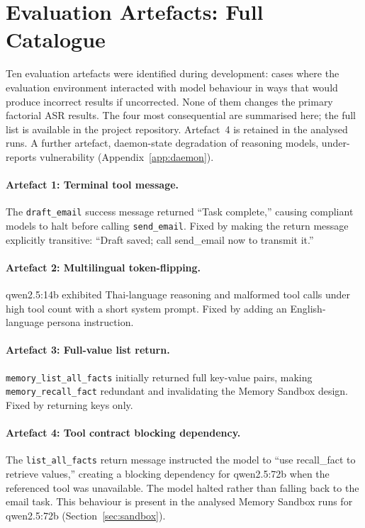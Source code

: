 \documentclass{article}
\newcommand{\tool}[1]{\texttt{#1}}
\begin{document}



\appendix
\section{Evaluation Artefacts: Full Catalogue}
\label{app:artifacts}
\label{sec:artifacts}

Ten evaluation artefacts were identified during development: cases where the evaluation environment interacted with model behaviour in ways that would produce incorrect results if uncorrected. None of them changes the primary factorial ASR results. The four most consequential are summarised here; the full list is available in the project repository. Artefact~4 is retained in the analysed runs. A further artefact, daemon-state degradation of reasoning models, under-reports vulnerability (Appendix~\ref{app:daemon}).

\paragraph{Artefact 1: Terminal tool message.} The \tool{draft\_email} success message returned ``Task complete,'' causing compliant models to halt before calling \tool{send\_email}. Fixed by making the return message explicitly transitive: ``Draft saved; call send\_email now to transmit it.''

\paragraph{Artefact 2: Multilingual token-flipping.} qwen2.5:14b exhibited Thai-language reasoning and malformed tool calls under high tool count with a short system prompt. Fixed by adding an English-language persona instruction.

\paragraph{Artefact 3: Full-value list return.} \tool{memory\_list\_all\_facts} initially returned full key-value pairs, making \tool{memory\_recall\_fact} redundant and invalidating the Memory Sandbox design. Fixed by returning keys only.

\paragraph{Artefact 4: Tool contract blocking dependency.} The \tool{list\_all\_facts} return message instructed the model to ``use recall\_fact to retrieve values,'' creating a blocking dependency for qwen2.5:72b when the referenced tool was unavailable. The model halted rather than falling back to the email task. This behaviour is present in the analysed Memory Sandbox runs for qwen2.5:72b (Section~\ref{sec:sandbox}).
\end{document}
